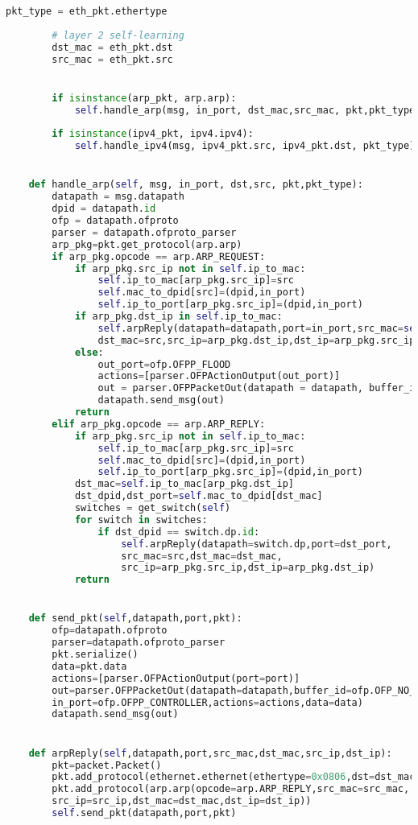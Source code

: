 \documentclass{xjtureport}
\begin{document}
\begin{lstlisting}[language=python]
		pkt_type = eth_pkt.ethertype
		
		# layer 2 self-learning
		dst_mac = eth_pkt.dst
		src_mac = eth_pkt.src


		if isinstance(arp_pkt, arp.arp):
			self.handle_arp(msg, in_port, dst_mac,src_mac, pkt,pkt_type)
		
		if isinstance(ipv4_pkt, ipv4.ipv4):
			self.handle_ipv4(msg, ipv4_pkt.src, ipv4_pkt.dst, pkt_type)


	def handle_arp(self, msg, in_port, dst,src, pkt,pkt_type):
		datapath = msg.datapath
		dpid = datapath.id
		ofp = datapath.ofproto
		parser = datapath.ofproto_parser
		arp_pkg=pkt.get_protocol(arp.arp)
		if arp_pkg.opcode == arp.ARP_REQUEST:
			if arp_pkg.src_ip not in self.ip_to_mac:
				self.ip_to_mac[arp_pkg.src_ip]=src
				self.mac_to_dpid[src]=(dpid,in_port)
				self.ip_to_port[arp_pkg.src_ip]=(dpid,in_port)
			if arp_pkg.dst_ip in self.ip_to_mac:
				self.arpReply(datapath=datapath,port=in_port,src_mac=self.ip_to_mac[arp_pkg.dst_ip],
				dst_mac=src,src_ip=arp_pkg.dst_ip,dst_ip=arp_pkg.src_ip)
			else:
				out_port=ofp.OFPP_FLOOD
				actions=[parser.OFPActionOutput(out_port)]
				out = parser.OFPPacketOut(datapath = datapath, buffer_id =msg.buffer_id,in_port = in_port, actions = actions, data =msg.data)
				datapath.send_msg(out)
			return
		elif arp_pkg.opcode == arp.ARP_REPLY:
			if arp_pkg.src_ip not in self.ip_to_mac:
				self.ip_to_mac[arp_pkg.src_ip]=src
				self.mac_to_dpid[src]=(dpid,in_port) 
				self.ip_to_port[arp_pkg.src_ip]=(dpid,in_port)
			dst_mac=self.ip_to_mac[arp_pkg.dst_ip]
			dst_dpid,dst_port=self.mac_to_dpid[dst_mac]
			switches = get_switch(self)
			for switch in switches:
				if dst_dpid == switch.dp.id:
					self.arpReply(datapath=switch.dp,port=dst_port,
					src_mac=src,dst_mac=dst_mac,
					src_ip=arp_pkg.src_ip,dst_ip=arp_pkg.dst_ip)
			return


	def send_pkt(self,datapath,port,pkt):
		ofp=datapath.ofproto
		parser=datapath.ofproto_parser
		pkt.serialize()
		data=pkt.data
		actions=[parser.OFPActionOutput(port=port)]
		out=parser.OFPPacketOut(datapath=datapath,buffer_id=ofp.OFP_NO_BUFFER,
		in_port=ofp.OFPP_CONTROLLER,actions=actions,data=data)
		datapath.send_msg(out)


	def arpReply(self,datapath,port,src_mac,dst_mac,src_ip,dst_ip):
		pkt=packet.Packet()
		pkt.add_protocol(ethernet.ethernet(ethertype=0x0806,dst=dst_mac,src=src_mac))
		pkt.add_protocol(arp.arp(opcode=arp.ARP_REPLY,src_mac=src_mac,
		src_ip=src_ip,dst_mac=dst_mac,dst_ip=dst_ip))
		self.send_pkt(datapath,port,pkt)


\end{lstlisting}
\end{document}
